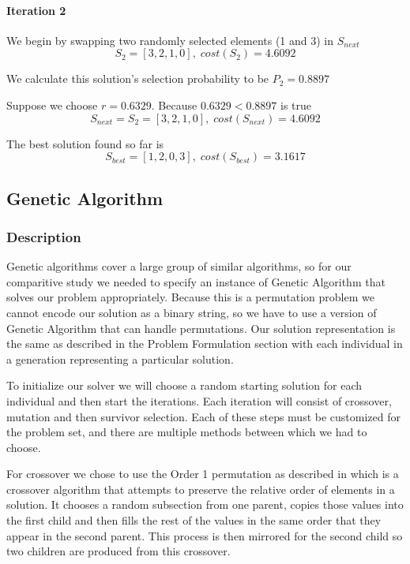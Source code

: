 \documentclass[a4paper]{article}
\newcommand{\subsubsubsection}[1]{\paragraph{#1} \mbox{}}
\begin{document}
\subsubsubsection{Iteration 2}

We begin by swapping two randomly selected elements (1 and 3) in $S_\mathit{next}$
$$S_2 = [ 3, 2, 1, 0 ], \; \mathit{cost}(S_2) = 4.6092$$

We calculate this solution's selection probability to be $P_2 = 0.8897$

Suppose we choose $r = 0.6329$. Because $0.6329 < 0.8897$ is true
$$S_\mathit{next} = S_2 = [ 3, 2, 1, 0 ], \; \mathit{cost}(S_\mathit{next}) = 4.6092$$

The best solution found so far is
$$S_\mathit{best} = [ 1, 2, 0, 3 ], \; \mathit{cost}(S_\mathit{best}) = 3.1617$$

\subsection{Genetic Algorithm} %

\subsubsection{Description}

Genetic algorithms cover a large group of similar algorithms, so for our comparitive study we needed to specify an instance of Genetic Algorithm that solves our problem appropriately. Because this is a permutation problem we cannot encode our solution as a binary string, so we have to use a version of Genetic Algorithm that can handle permutations. Our solution representation is the same as described in the Problem Formulation section with each individual in a generation representing a particular solution. 

To initialize our solver we will choose a random starting solution for each individual and then start the iterations. Each iteration will consist of crossover, mutation and then survivor selection. Each of these steps must be customized for the problem set, and there are multiple methods between which we had to choose. 

For crossover we chose to use the Order 1 permutation as described in \cite{Eiben} which is a crossover algorithm that attempts to preserve the relative order of elements in a solution. It chooses a random subsection from one parent, copies those values into the first child and then fills the rest of the values in the same order that they appear in the second parent. This process is then mirrored for the second child so two children are produced from this crossover.
\end{document}
